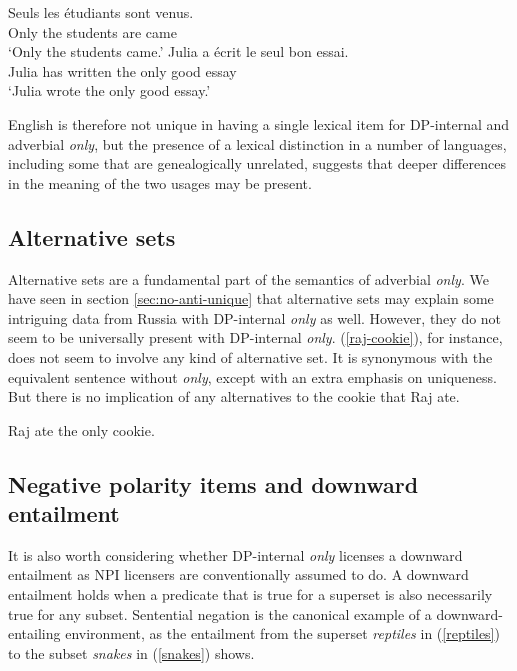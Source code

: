\begin{exe}
	\ex \gll Seuls les \'{e}tudiants sont venus.\\
	Only the students are came\\
	\glt `Only the students came.'
	\ex \gll Julia a \'{e}crit le seul bon essai.\\
	Julia has written the only good essay\\
	\glt `Julia wrote the only good essay.'
\end{exe}

English is therefore not unique in having a single lexical item for DP-internal and adverbial \textit{only}, but the presence of a lexical distinction in a number of languages, including some that are genealogically unrelated, suggests that deeper differences in the meaning of the two usages may be present.

\subsection{Alternative sets}
Alternative sets are a fundamental part of the semantics of adverbial \textit{only}. We have seen in section \ref{sec:no-anti-unique} that alternative sets may explain some intriguing data from Russia with DP-internal \textit{only} as well. However, they do not seem to be universally present with DP-internal \textit{only}. (\ref{raj-cookie}), for instance, does not seem to involve any kind of alternative set. It is synonymous with the equivalent sentence without \textit{only}, except with an extra emphasis on uniqueness. But there is no implication of any alternatives to the cookie that Raj ate.

\begin{exe}
	\ex \label{raj-cookie} Raj ate the only cookie.
\end{exe}


\subsection{Negative polarity items and downward entailment}
It is also worth considering whether DP-internal \textit{only} licenses a downward entailment as NPI licensers are conventionally assumed to do. A downward entailment holds when a predicate that is true for a superset is also necessarily true for any subset. Sentential negation is the canonical example of a downward-entailing environment, as the entailment from the superset \textit{reptiles} in (\ref{reptiles}) to the subset \textit{snakes} in (\ref{snakes}) shows.

